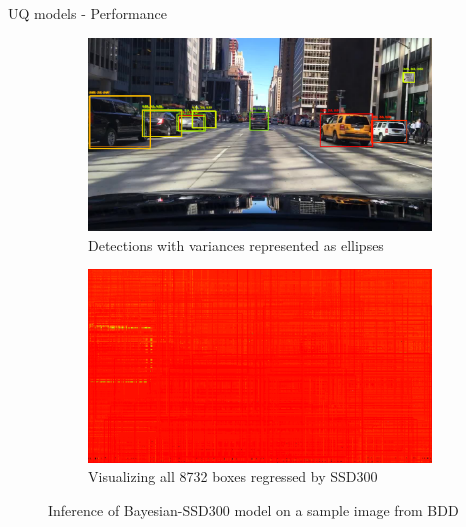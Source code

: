 \documentclass[10pt, aspectratio=169]{beamer}
\begin{document}
\begin{frame}[allowframebreaks]{UQ models - Performance}
       \begin{figure}[H]
        \captionsetup[table]{skip=0pt}
           \centering
           \begin{subfigure}[t]{0.495\textwidth}
               \centering
               \includegraphics[width=\textwidth]{images/det_images/bdd_bnn_variances_1.png}
               \caption{Detections with variances represented as ellipses}
           \end{subfigure}
           \begin{subfigure}[t]{0.495\textwidth}
               \centering
               \includegraphics[width=\textwidth]{images/det_images/all_bnn_bdd_1.png}
               \caption{Visualizing all 8732 boxes regressed by SSD300}
           \end{subfigure}
           \caption{Inference of Bayesian-SSD300 model on a sample image from BDD}
       \end{figure}
    

\end{frame}
\end{document}
